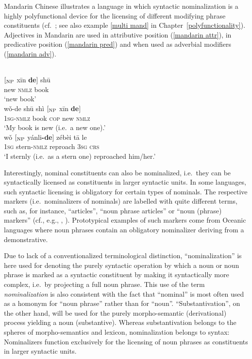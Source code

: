 Mandarin Chinese illustrates a language in which syntactic nominalization is a highly polyfunctional device for the licensing of different modifying phrase constituents (cf.~\citealt[575–593]{li-etal1981}; see also example \ref{multi mand} in Chapter~\ref{polyfunctionality}). Adjectives in Mandarin are used in attributive position (\ref{mandarin attr}), in predicative position (\ref{mandarin pred}) and when used as adverbial modifiers (\ref{mandarin adv}).
\begin{exe}
\ex
{}
\begin{xlist}
\\
\gll	$[_{\rm NP}$ xīn 		\textbf{de}$]$ 	shū\\
	{} new	 	\textsc{nmlz}  	book\\
\glt	‘new book’\label{mandarin attr}
\\
\gll	wǒ-de shū shì $[_{\rm NP}$ xīn \textbf{de}$]$\\
	\textsc{1sg-nmlz} book \textsc{cop} {} new \textsc{nmlz}\\
\glt	‘My book is new (i.e.~a new one).’\label{mandarin pred}
\\
\gll	wǒ $[_{\rm NP}$ yánli\textbf{-de}$]$ zébèi tā le\\
	\textsc{1sg} {} stern\textsc{-nmlz} reproach \textsc{3sg} \textsc{crs}\\
\glt	‘I sternly (i.e.~as a stern one) reproached him/her.’ \label{mandarin adv}
\end{xlist}
\end{exe}
Interestingly, nominal constituents can also be nominalized, i.e.~they can be syntactically licensed as constituents in larger syntactic units. In some languages, such syntactic licensing is obligatory for certain types of nominals. The respective markers (i.e.~nominalizers of nominals) are labelled with quite different terms, such as, for instance, “articles”, “noun phrase articles” or “noun (phrase) markers” (cf., e.g., \citealt[152]{dryer2007}, \citealt[95, elsewhere]{rijkhoff2002}). Prototypical examples of such markers come from Oceanic languages where noun phrases contain an obligatory nominalizer deriving from a demonstrative. 

Due to lack of a conventionalized terminological distinction, “nominalization” is here used for denoting the purely syntactic operation by which a noun or noun phrase is marked as a syntactic constituent by making it syntactically more complex, i.e.~by projecting a full noun phrase. This use of the term \emph{nominalization} is also consistent with the fact that “nominal” is most often used as a homonym for “noun phrase” rather than for “noun”. “Substantivation”, on the other hand, will be used for the purely morpho-semantic (derivational) process yielding a noun (substantive). Whereas substantivation belongs to the spheres of morpho-semantics and lexicon, nominalization belongs to syntax: Nominalizers function exclusively for the licensing of noun phrases as constituents in larger syntactic units. 

